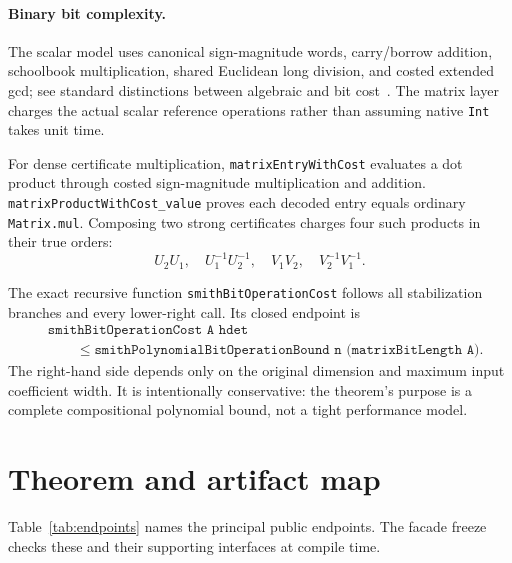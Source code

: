 \documentclass[11pt]{article}
\newcommand{\code}[1]{\texttt{#1}}
\begin{document}
\paragraph{Binary bit complexity.}
The scalar model uses canonical sign-magnitude words, carry/borrow addition,
schoolbook multiplication, shared Euclidean long division, and costed
extended gcd; see standard distinctions between algebraic and bit
cost~\citep[Chapter 1]{brentZimmermann2010}.  The matrix layer charges the actual scalar
reference operations rather than assuming native \code{Int} takes unit time.

For dense certificate multiplication, \code{matrixEntryWithCost} evaluates a
dot product through costed sign-magnitude multiplication and addition.
\code{matrixProductWithCost\_value} proves each decoded entry equals ordinary
\code{Matrix.mul}.  Composing two strong certificates charges four such
products in their true orders:
\[
  U_2U_1,\quad U_1^{-1}U_2^{-1},\quad
  V_1V_2,\quad V_2^{-1}V_1^{-1}.
\]

The exact recursive function \code{smithBitOperationCost} follows all
stabilization branches and every lower-right call.  Its closed endpoint is
\[
\begin{split}
 &\code{smithBitOperationCost A hdet}\\
 &\qquad\le
 \code{smithPolynomialBitOperationBound n (matrixBitLength A)}.
\end{split}
\]
The right-hand side depends only on the original dimension and maximum input
coefficient width.  It is intentionally conservative: the theorem's purpose
is a complete compositional polynomial bound, not a tight performance model.

\section{Theorem and artifact map}

Table~\ref{tab:endpoints} names the principal public endpoints.  The facade
freeze checks these and their supporting interfaces at compile time.
\end{document}
